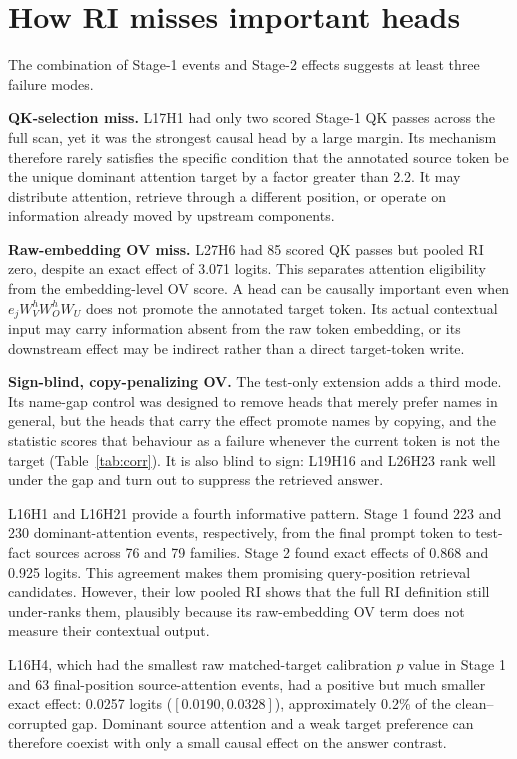 \documentclass[11pt,a4paper]{article}
\begin{document}
\section{How RI misses important heads}
The combination of Stage-1 events and Stage-2 effects suggests at least three
failure modes.

\textbf{QK-selection miss.} L17H1 had only two scored Stage-1 QK passes across
the full scan, yet it was the strongest causal head by a large margin. Its
mechanism therefore rarely satisfies the specific condition that the annotated
source token be the unique dominant attention target by a factor greater than
2.2. It may distribute attention, retrieve through a different position, or
operate on information already moved by upstream components.

\textbf{Raw-embedding OV miss.} L27H6 had 85 scored QK passes but pooled RI zero,
despite an exact effect of 3.071 logits. This separates attention eligibility
from the embedding-level OV score. A head can be causally important even when
$e_jW_V^hW_O^hW_U$ does not promote the annotated target token. Its actual
contextual input may carry information absent from the raw token embedding, or
its downstream effect may be indirect rather than a direct target-token write.

\textbf{Sign-blind, copy-penalizing OV.} The test-only extension adds a third
mode. Its name-gap control was designed to remove heads that merely prefer
names in general, but the heads that carry the effect promote names by copying,
and the statistic scores that behaviour as a failure whenever the current token
is not the target (Table~\ref{tab:corr}). It is also blind to sign: L19H16 and
L26H23 rank well under the gap and turn out to suppress the retrieved answer.

L16H1 and L16H21 provide a fourth informative pattern. Stage 1 found 223 and 230
dominant-attention events, respectively, from the final prompt token to
test-fact sources across 76 and 79 families. Stage 2 found exact effects of
0.868 and 0.925 logits. This agreement makes them promising query-position
retrieval candidates. However, their low pooled RI shows that the full RI
definition still under-ranks them, plausibly because its raw-embedding OV term
does not measure their contextual output.

L16H4, which had the smallest raw matched-target calibration $p$ value in
Stage 1 and 63 final-position source-attention events, had a positive but much
smaller exact effect: 0.0257 logits ($[0.0190,0.0328]$), approximately 0.2\% of
the clean--corrupted gap. Dominant source attention and a weak target preference
can therefore coexist with only a small causal effect on the answer contrast.
\end{document}
